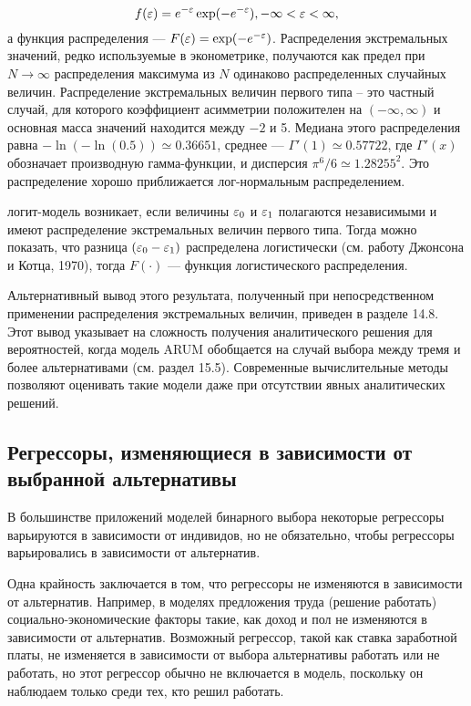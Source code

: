 \begin{equation} 
\label{GrindEQ__14_21_} 
f(\varepsilon) = e^{-\varepsilon} \exp (-e^{-\varepsilon}), -\infty < \varepsilon <\infty,   
\end{equation} 
а функция распределения --- $F(\varepsilon) = \exp (-e^{-\varepsilon})$. Распределения экстремальных значений, редко используемые в эконометрике,  получаются как предел  при $N\to \infty $ распределения максимума из $N$ одинаково распределенных случайных величин. Распределение экстремальных величин первого типа -- это частный случай,  для которого коэффициент асимметрии положителен на $(-\infty, \infty)$ и основная масса значений находится между $-2$ и 5. Медиана этого распределения равна $-\ln (-\ln(0.5)) \simeq 0.36651$, среднее --- $\Gamma'(1)\simeq 0.57722$,  где $\Gamma'(x)$ обозначает производную гамма-функции,  и дисперсия $\pi^6/6 \simeq 1.28255^2$. Это распределение хорошо приближается лог-нормальным распределением.

логит-модель возникает,  если величины $\varepsilon_0$ и $\varepsilon_1$ полагаются независимыми и имеют распределение экстремальных величин первого типа. Тогда можно показать,  что разница $(\varepsilon_0 - \varepsilon_1)$ распределена логистически (см. работу Джонсона и Котца, 1970),  тогда $F(\cdot)$ --- функция логистического распределения.

Альтернативный вывод этого результата,  полученный при непосредственном применении распределения экстремальных величин,  приведен в разделе 14.8. Этот вывод указывает на сложность получения аналитического решения для вероятностей,  когда модель ARUM обобщается на случай выбора между тремя и более альтернативами (см. раздел 15.5). Современные вычислительные методы позволяют оценивать такие модели даже при отсутствии явных аналитических решений.

\subsection{Регрессоры,  изменяющиеся в зависимости от выбранной альтернативы}

В большинстве приложений моделей бинарного выбора некоторые регрессоры варьируются в зависимости от индивидов,  но не обязательно,  чтобы регрессоры варьировались в зависимости от альтернатив.

Одна крайность заключается в том,  что регрессоры не изменяются в зависимости от альтернатив. Например,  в моделях предложения труда (решение работать) социально-экономические факторы такие,  как доход и пол не изменяются в зависимости от альтернатив. Возможный регрессор,  такой как ставка заработной платы,  не изменяется в зависимости от выбора альтернативы работать или не работать,  но этот регрессор обычно не включается в модель,  поскольку он наблюдаем только среди тех,  кто решил работать.

